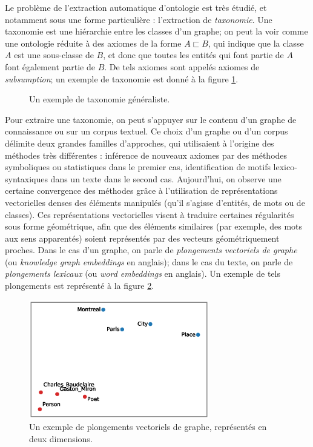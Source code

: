 Le problème de l'extraction automatique d'ontologie est très étudié, et notamment sous une forme particulière : l'extraction de \textit{taxonomie}. Une taxonomie est une hiérarchie entre les classes d'un graphe; on peut la voir comme une ontologie réduite à des axiomes de la forme $A \sqsubset B$, qui indique que la classe $A$ est une sous-classe de $B$, et donc que toutes les entités qui font partie de $A$ font également partie de $B$. De tels axiomes sont appelés axiomes de \textit{subsumption}; un exemple de taxonomie est donné à la figure \ref{fig:intro-taxo}.

\begin{figure}[h]
    \centering
    
    \caption{Un exemple de taxonomie généraliste.}
    \label{fig:intro-taxo}
\end{figure}


Pour extraire une taxonomie, on peut s'appuyer sur le contenu d'un graphe de connaissance ou sur un corpus textuel. Ce choix d'un graphe ou d'un corpus délimite deux grandes familles d'approches, qui utilisaient à l'origine des méthodes très différentes :
inférence de nouveaux axiomes par des méthodes symboliques ou statistiques dans le premier cas,  identification de motifs lexico-syntaxiques dans un texte dans le second cas. Aujourd'hui, 
on observe une certaine convergence des méthodes grâce à l'utilisation de représentations vectorielles denses des éléments manipulés (qu'il s'agisse d'entités, de mots ou de classes). Ces représentations vectorielles visent à traduire certaines régularités sous forme géométrique, afin que des éléments similaires (par exemple, des mots aux sens apparentés) soient représentés par des vecteurs géométriquement proches. Dans le cas d'un graphe, on parle de \textit{plongements vectoriels de graphe} (ou \textit{knowledge graph embeddings} en anglais); dans le cas du texte, on parle de \textit{plongements lexicaux} (ou \textit{word embeddings} en anglais). Un exemple de tels plongements est représenté à la figure \ref{fig:intro-embeddings}.

%

\begin{figure}[h]
    \centering
    \includegraphics[width=0.7\textwidth]{img/embedding_pca_transe2.eps}
    \caption[Exemple de plongements vectoriels]{
    Un exemple de plongements vectoriels de graphe, représentés en deux dimensions\footnotemark.}
    \label{fig:intro-embeddings}
\end{figure}

